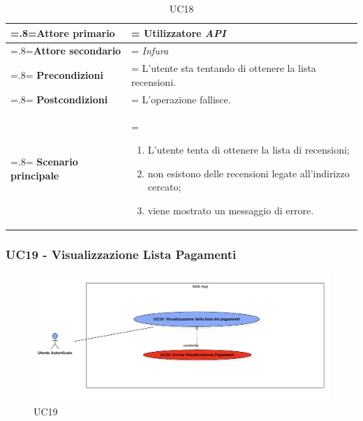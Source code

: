             \begin{table}[H]
                \centering
                \renewcommand{\arraystretch}{1.8}
                \renewcommand\tabularxcolumn[1]{m{#1}}
                \begin{tabularx}{0.9\textwidth} {
                    >{\hsize=.8\hsize\linewidth=\hsize}X
                    >{\hsize=1.2\hsize\linewidth=\hsize}X}
                    \hline
                    \textbf{Attore primario} & Utilizzatore \textit{API} \\
                    \hline
                    \textbf{Attore secondario} & \textit{Infura} \\
                    \hline
                    \textbf{Precondizioni} & L'utente sta tentando di ottenere la lista recensioni. \\
                    \hline
                    \textbf{Postcondizioni} & L'operazione fallisce. \\
                    \hline
                    \textbf{Scenario principale} &
                        \begin{enumerate}
                            \item L'utente tenta di ottenere la lista di recensioni;
                            \item non esistono delle recensioni legate all'indirizzo cercato;
                            \item viene mostrato un messaggio di errore.
                        \end{enumerate} \\
                    \hline
                \end{tabularx}
                \caption{UC18}
            \end{table}

        \subsubsection{UC19 - Visualizzazione Lista Pagamenti}
        \label{UC19}

            \begin{figure}[H]
                \centering
                \includegraphics[scale=0.4]{src/img/UC19.png}
                \caption{UC19}
            \end{figure}

